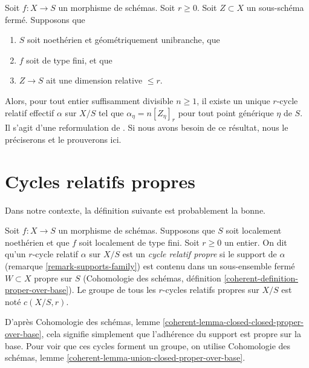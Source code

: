 \begin{remark} 
\label{remark-equidimensional-over-geometrically-unibranch} 
Soit  $f : X \to S$  un morphisme de schémas. Soit  $r \geq 0$. Soit  $Z \subset X$
  un sous-schéma fermé. Supposons que 
\begin{enumerate} 
\item $S$  soit noethérien et géométriquement unibranche, que 
\item $f$  soit de type fini, et que 
\item $Z \to S$  ait une dimension relative  $\leq r$. 
\end{enumerate} 
Alors, pour tout entier suffisamment divisible $n \geq 1$, il 
existe un unique $r$-cycle relatif effectif $\alpha$ sur $X/S$ tel que 
$\alpha_\eta = n[Z_\eta]_r$ pour tout point générique $\eta$  de  $S$.
 Il s'agit d'une reformulation de  \cite[Theorem 3.4.2]{SV}. 
Si nous avons besoin de ce résultat, nous le préciserons et le prouverons ici. 
\end{remark} 











\section{Cycles relatifs propres} 
\label{section-proper} 

\noindent
 Dans notre contexte, la définition suivante est probablement la bonne. 

\begin{definition} 
\label{definition-proper} 
Soit  $f : X \to S$  un morphisme de schémas. Supposons que  $S$  soit localement noethérien et
 que  $f$  soit localement de type fini. Soit $r \geq 0$  un entier. On dit 
qu'un  $r$-cycle relatif  $\alpha$  sur $X/S$  est un  {\it  cycle relatif propre} 
 si le support de  $\alpha$  (remarque \ref{remark-supports-family}) est
 contenu dans un sous-ensemble fermé  $W \subset X$  propre sur  $S$
  (Cohomologie des schémas, définition \ref{coherent-definition-proper-over-base}).
 Le groupe de tous les  $r$-cycles relatifs propres sur  $X/S$  
est noté  $c(X/S, r)$. 
\end{definition} 

\noindent
 D'après Cohomologie des schémas, lemme 
\ref{coherent-lemma-closed-closed-proper-over-base}, cela 
signifie simplement que l'adhérence du support est propre sur la base. Pour voir que
 ces cycles forment un groupe, on utilise
 Cohomologie des schémas, lemme \ref{coherent-lemma-union-closed-proper-over-base}. 

